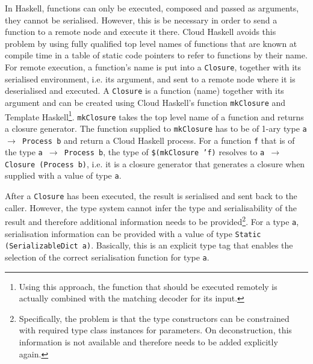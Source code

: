 In \textsf{Haskell}, functions can only be executed, composed and passed as arguments, they cannot be serialised. However, this is be necessary in order to send a function to a remote node and execute it there. \textsf{Cloud Haskell} avoids this problem by using fully qualified top level names of functions that are known at compile time in a table of static code pointers to refer to functions by their name. For remote execution, a function's name is put into a \texttt{Closure}, together with its serialised environment, i.e. its argument, and sent to a remote node where it is deserialised and executed. A \texttt{Closure} is a function (name) together with its argument \cite{Epstein:2011:THC:2034675.2034690} and can be created using \textsf{Cloud Haskell}'s function \texttt{mkClosure} and \textsf{Template Haskell}\footnote{Using this approach, the function that should be executed remotely is actually combined with the matching decoder for its input.}. \texttt{mkClosure} takes the top level name of a function and returns a closure generator. The function supplied to \texttt{mkClosure} has to be of 1-ary type \texttt{a $\to$ Process b} and return a \textsf{Cloud Haskell} process. For a function \texttt{f} that is of the type \texttt{a $\to$ Process b}, the type of \texttt{\$(mkClosure 'f)} resolves to \texttt{a $\to$ Closure (Process b)}, i.e. it is a closure generator that generates a closure when supplied with a value of type \texttt{a}.

After a \texttt{Closure} has been executed, the result is serialised and sent back to the caller. However, the type system cannot infer the type and serialisability of the result and therefore additional information needs to be provided\footnote{Specifically, the problem is that the type constructors can be constrained with required type class instances for parameters. On deconstruction, this information is not available and therefore needs to be added explicitly again.}. For a type \texttt{a}, serialisation information can be provided with a value of type \texttt{Static (SerializableDict a)}. Basically, this is an explicit type tag that enables the selection of the correct serialisation function for type \texttt{a}.

